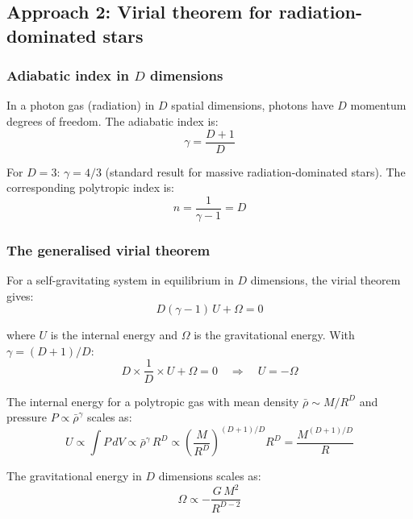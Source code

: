 \documentclass[10pt,a4paper]{article}
\begin{document}
\subsection{Approach 2: Virial theorem for radiation-dominated stars}\label{sec:virial}

\subsubsection{Adiabatic index in $D$ dimensions}

In a photon gas (radiation) in $D$ spatial dimensions, photons have $D$ momentum degrees of freedom. The adiabatic index is:
\begin{equation}
\gamma = \frac{D+1}{D}
\end{equation}

For $D = 3$: $\gamma = 4/3$ (standard result for massive radiation-dominated stars). The corresponding polytropic index is:
\begin{equation}
n = \frac{1}{\gamma - 1} = D
\end{equation}

\subsubsection{The generalised virial theorem}

For a self-gravitating system in equilibrium in $D$ dimensions, the virial theorem gives:
\begin{equation}
D(\gamma - 1)\,U + \Omega = 0
\end{equation}

where $U$ is the internal energy and $\Omega$ is the gravitational energy. With $\gamma = (D+1)/D$:
\begin{equation}
D \times \frac{1}{D} \times U + \Omega = 0 \quad \Longrightarrow \quad U = -\Omega
\end{equation}

The internal energy for a polytropic gas with mean density $\bar{\rho} \sim M/R^D$ and pressure $P \propto \bar{\rho}^\gamma$ scales as:
\begin{equation}
U \propto \int P\,dV \propto \bar{\rho}^{\gamma}\,R^D \propto \left(\frac{M}{R^D}\right)^{(D+1)/D} R^D = \frac{M^{(D+1)/D}}{R}
\end{equation}

The gravitational energy in $D$ dimensions scales as:
\begin{equation}
\Omega \propto -\frac{G\,M^2}{R^{D-2}}
\end{equation}
\end{document}
